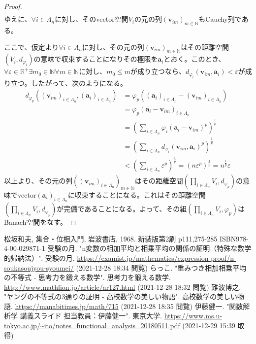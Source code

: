 \documentclass[dvipdfmx]{jsarticle}
\begin{document}
\begin{proof}
\begin{align*}
\end{align*}
ゆえに、$\forall i \in \varLambda_{n}$に対し、そのvector空間$V_{i}$の元の列$\left( \mathbf{v}_{im} \right)_{m \in \mathbb{N}}$もCauchy列である。\par
ここで、仮定より$\forall i \in \varLambda_{n}$に対し、その元の列$\left( \mathbf{v}_{im} \right)_{m \in \mathbb{N}}$はその距離空間$\left( V_{i},d_{\varphi_{i}} \right)$の意味で収束することになりその極限を$\mathbf{a}_{i}$とおく。このとき、$\forall\varepsilon \in \mathbb{R}^{+}\exists m_{0} \in \mathbb{N}\forall m \in \mathbb{N}$に対し、$m_{0} \leq m$が成り立つなら、$d_{\varphi_{i}}\left( \mathbf{v}_{im},\mathbf{a}_{i} \right) < \varepsilon$が成り立つ。したがって、次のようになる。
\begin{align*}
d_{\varphi_{p}}\left( \left( \mathbf{v}_{im} \right)_{i \in \varLambda_{n}},\left( \mathbf{a}_{i} \right)_{i \in \varLambda_{n}} \right) &= \varphi_{p}\left( \left( \mathbf{a}_{i} \right)_{i \in \varLambda_{n}} - \left( \mathbf{v}_{im} \right)_{i \in \varLambda_{n}} \right)\\
&= \varphi_{p}\left( \mathbf{a}_{i} - \mathbf{v}_{im} \right)_{i \in \varLambda_{n}}\\
&= \left( \sum_{i \in \varLambda_{n}} {\varphi_{i}\left( \mathbf{a}_{i} - \mathbf{v}_{im} \right)}^{p} \right)^{\frac{1}{p}}\\
&= \left( \sum_{i \in \varLambda_{n}} {d_{\varphi_{i}}\left( \mathbf{v}_{im},\mathbf{a}_{i} \right)}^{p} \right)^{\frac{1}{p}}\\
&< \left( \sum_{i \in \varLambda_{n}} \varepsilon^{p} \right)^{\frac{1}{p}} = \left( n\varepsilon^{p} \right)^{\frac{1}{p}} = n^{\frac{1}{p}}\varepsilon
\end{align*}
以上より、その元の列$\left( \left( \mathbf{v}_{im} \right)_{i \in \varLambda_{n}} \right)_{m \in \mathbb{N}}$はその距離空間$\left( \prod_{i \in \varLambda_{n}} V_{i},d_{\varphi_{p}} \right)$の意味でvector$\left( \mathbf{a}_{i} \right)_{i \in \varLambda_{n}}$に収束することになる。これはその距離空間$\left( \prod_{i \in \varLambda_{n}} V_{i},d_{\varphi_{p}} \right)$が完備であることになる。よって、その組$\left( \prod_{i \in \varLambda_{n}} V_{i},\varphi_{p} \right)$はBanach空間をなす。
\end{proof}
\begin{thebibliography}{50}
  松坂和夫, 集合・位相入門, 岩波書店, 1968. 新装版第2刷 p111,275-285 ISBN978-4-00-029871-1
  受験の月. "n変数の相加平均と相乗平均の関係の証明（特殊な数学的帰納法）". 受験の月. \url{https://examist.jp/mathematics/expression-proof/n-soukasoujyou-syoumei/} (2021-12-28 18:34 閲覧)
  らっこ. "重みつき相加相乗平均の不等式 - 思考力を鍛える数学". 思考力を鍛える数学. \url{http://www.mathlion.jp/article/ar127.html} (2021-12-28 18:32 閲覧)
  難波博之. "ヤングの不等式の3通りの証明 - 高校数学の美しい物語". 高校数学の美しい物語. \url{https://manabitimes.jp/math/715} (2021-12-28 18:35 閲覧)
  伊藤健一. "関数解析学 講義スライド 担当教員：伊藤健一". 東京大学. \url{https://www.ms.u-tokyo.ac.jp/~ito/notes\_functional\_analysis\_20180511.pdf} (2021-12-29 15:39 取得)
\end{thebibliography}
\end{document}
